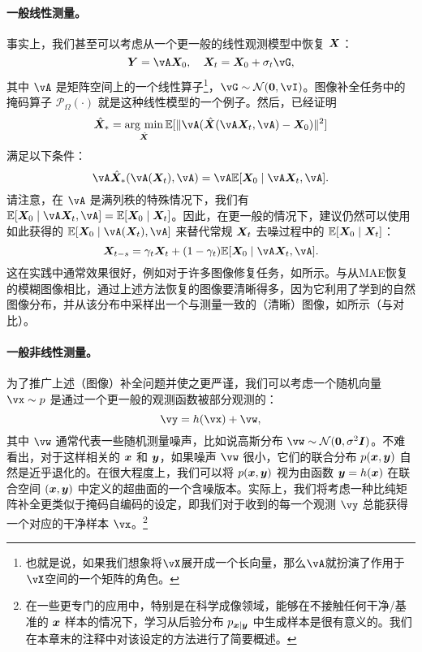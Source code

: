 \documentclass[../../book-main_zh.tex]{subfiles}
\begin{document}
\paragraph{一般线性测量。} 
事实上，我们甚至可以考虑从一个更一般的线性观测模型中恢复 $\bm{X}$：
\begin{equation}
    \Y = \vA\X_0,  \quad \X_t = \X_0 + \sigma_t \vG,  
\end{equation}
其中 $\vA$ 是矩阵空间上的一个线性算子\footnote{也就是说，如果我们想象将\(\vX\)展开成一个长向量，那么\(\vA\)就扮演了作用于\(\vX\)空间的一个矩阵的角色。}，$\vG \sim \mathcal{N}(\boldsymbol{0}, \vI)$。图像补全任务中的掩码算子 $\mathcal{P}_{\Omega}(\cdot)$ 就是这种线性模型的一个例子。然后，\cite{daras2023ambient}已经证明
\begin{equation}
    \hat{\X}_* = \argmin_{\hat{\X}} \mathbb{E}[\|\vA(\hat{\X}(\vA\X_t, \vA) - \X_0)\|^2]
\end{equation}
满足以下条件：
\begin{equation}
    \vA \hat{\X}_*(\vA(\X_t), \vA) = \vA \mathbb{E}[\X_0 \mid \vA \X_t, \vA].
\end{equation} 
请注意，在 $\vA$ 是满列秩的特殊情况下，我们有 $ \mathbb{E}[\X_0 \mid \vA\X_t, \vA] = \mathbb{E}[\X_0 \mid \X_t]$。因此，在更一般的情况下，\cite{daras2023ambient}建议仍然可以使用如此获得的 $\mathbb{E}[\X_0 \mid \vA(\X_t), \vA]$ 来替代常规 $\bm{X}_t$ 去噪过程中的 $\mathbb{E}[\bm{X}_0 \mid \bm{X}_t]$：
\begin{equation}
    \X_{t-s} = \gamma_t \X_t + (1-\gamma_t) \mathbb{E}[\X_0 \mid \vA\X_t, \vA].
\end{equation}
这在实践中通常效果很好，例如对于许多图像修复任务，如\cite{daras2023ambient}所示。与从MAE恢复的模糊图像相比，通过上述方法恢复的图像要清晰得多，因为它利用了学到的自然图像分布，并从该分布中采样出一个与测量一致的（清晰）图像，如所示（与对比）。


\paragraph{一般非线性测量。}
为了推广上述（图像）补全问题并使之更严谨，我们可以考虑一个随机向量 $\vx \sim p$ 是通过一个更一般的观测函数被部分观测的：
\begin{equation}\label{eq:measurement-matching-observation}
\vy = h(\vx) + \vw,
\end{equation}
其中 $\vw$ 通常代表一些随机测量噪声，比如说高斯分布 $\vw \sim \mathcal{N}(\mathbf{0}, \sigma^2 \boldsymbol{I})$。不难看出，对于这样相关的 $\bm{x}$ 和 $\bm{y}$，如果噪声 $\vw$ 很小，它们的联合分布 $p(\bm{x}, \bm{y})$ 自然是近乎退化的。在很大程度上，我们可以将 $p(\bm{x}, \bm{y})$ 视为由函数 $\bm{y} = h(\bm{x})$ 在联合空间 $(\bm{x}, \bm{y})$ 中定义的超曲面的一个含噪版本。实际上，我们将考虑一种比纯矩阵补全更类似于掩码自编码的设定，即我们对于收到的每一个观测 $\vy$ 总能获得一个对应的干净样本 $\vx$。\footnote{在一些更专门的应用中，特别是在科学成像领域，能够在不接触任何干净/基准的 $\bm{x}$ 样本的情况下，学习从后验分布 $p_{\bm{x} \mid \bm{y}}$ 中生成样本是很有意义的。我们在本章末的注释中对该设定的方法进行了简要概述。}
\end{document}
